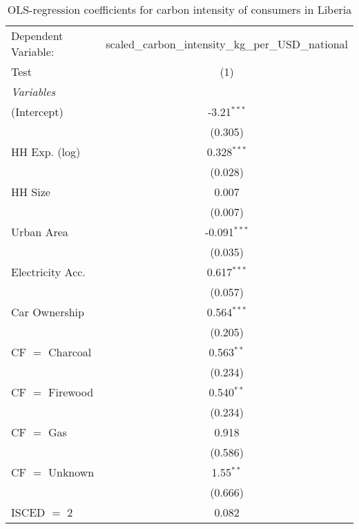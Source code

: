 
\begin{table}[htbp!]
   \centering
   \small
   \begin{adjustbox}{width = 1\textwidth, max height = 0.95\textheight, center}
      \begin{threeparttable}[b]
         \caption{\label{tab:OLS_1_LBR} OLS-regression coefficients for carbon intensity of consumers in Liberia}
         \begin{tabular}{lc}
            \tabularnewline \midrule \midrule
            Dependent Variable: & scaled\_carbon\_intensity\_kg\_per\_USD\_national\\        
            Test                & (1)\\  
            \midrule
            \emph{Variables}\\
            (Intercept)         & -3.21$^{***}$\\   
                                & (0.305)\\   
            HH Exp. (log)       & 0.328$^{***}$\\   
                                & (0.028)\\   
            HH Size             & 0.007\\   
                                & (0.007)\\   
            Urban Area          & -0.091$^{***}$\\   
                                & (0.035)\\   
            Electricity Acc.    & 0.617$^{***}$\\   
                                & (0.057)\\   
            Car Ownership       & 0.564$^{***}$\\   
                                & (0.205)\\   
            CF $=$ Charcoal     & 0.563$^{**}$\\   
                                & (0.234)\\   
            CF $=$ Firewood     & 0.540$^{**}$\\   
                                & (0.234)\\   
            CF $=$ Gas          & 0.918\\   
                                & (0.586)\\   
            CF $=$ Unknown      & 1.55$^{**}$\\   
                                & (0.666)\\   
            ISCED $=$ 2         & 0.082\\   

\end{tabular}
\end{threeparttable}
\end{adjustbox}
\end{table}
